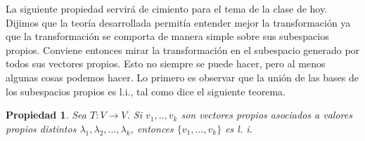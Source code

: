 \documentclass[12pt]{book}
\newtheorem{prop}{Propiedad}
\begin{document}
La siguiente propiedad servirá de cimiento para el tema de la clase de hoy.
Dijimos que la teoría desarrollada permitía entender mejor la transformación ya que la transformación se comporta de manera simple sobre sus subespacios propios.
Conviene entonces mirar la transformación en el subespacio generado por todos sus vectores propios.
Esto no siempre se puede hacer, pero al menos algunas cosas podemos hacer.
Lo primero es observar que la unión de las bases de los subespacios propios es l.i., tal como dice el siguiente teorema.

\begin{prop}\label{teo:vpli}
Sea $T:V\rightarrow V$.
Si $v_1,..,v_k$ son vectores propios asociados a valores propios distintos $\lambda_1,\lambda_2,\dots,\lambda_k$, entonces $\{v_1,\dots,v_k\}$ es l. i.
\end{prop}
\end{document}
